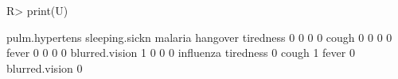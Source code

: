 \begin{Schunk}
% --begin: "comp.u"
\begin{Sinput}
R> print(U)
\end{Sinput}
\begin{Soutput}
               pulm.hypertens sleeping.sickn malaria hangover
tiredness                   0              0       0        0
cough                       0              0       0        0
fever                       0              0       0        0
blurred.vision              1              0       0        0
               influenza
tiredness              0
cough                  1
fever                  0
blurred.vision         0
\end{Soutput}
%
% --end: "comp.u"
\end{Schunk}
